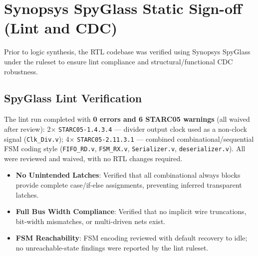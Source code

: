 \documentclass[11pt,a4paper]{article}
\begin{document}
\section{Synopsys SpyGlass Static Sign-off (Lint and CDC)}

Prior to logic synthesis, the RTL codebase was verified using Synopsys SpyGlass~\cite{spyglass} under the  ruleset to ensure lint compliance and structural/functional CDC robustness.

\subsection{SpyGlass Lint Verification}
The lint run completed with \textbf{0 errors and 6 STARC05 warnings} (all waived after review): 2$\times$ \texttt{STARC05-1.4.3.4} --- divider output clock used as a non-clock signal (\texttt{Clk\_Div.v}); 4$\times$ \texttt{STARC05-2.11.3.1} --- combined combinational/sequential FSM coding style (\texttt{FIFO\_RD.v}, \texttt{FSM\_RX.v}, \texttt{Serializer.v}, \texttt{deserializer.v}). All were reviewed and waived, with no RTL changes required.
\begin{itemize}
    \item \textbf{No Unintended Latches}: Verified that all combinational always blocks provide complete case/if-else assignments, preventing inferred transparent latches.
    \item \textbf{Full Bus Width Compliance}: Verified that no implicit wire truncations, bit-width mismatches, or multi-driven nets exist.
    \item \textbf{FSM Reachability}: FSM encoding reviewed with default recovery to idle; no unreachable-state findings were reported by the lint ruleset.
\end{itemize}
\end{document}
